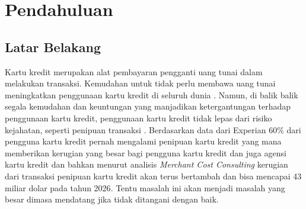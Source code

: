 \newpage
\chapter{Pendahuluan} \label{Bab I}

\section{Latar Belakang} \label{I.Latar Belakang}
Kartu kredit merupakan alat pembayaran pengganti uang tunai dalam melakukan transaksi. Kemudahan untuk tidak perlu membawa uang tunai meningkatkan penggunaan kartu kredit di seluruh dunia \cite{suryohadibroto1987surat}. Namun, di balik balik segala kemudahan dan keuntungan yang manjadikan ketergantungan terhadap penggunaan kartu kredit, penggunaan kartu kredit tidak lepas dari risiko kejahatan, seperti penipuan transaksi \cite{hendarsyah2020analisis}. Berdasarkan data dari Experian 60\% dari pengguna kartu kredit pernah mengalami penipuan kartu kredit yang mana memberikan kerugian yang besar bagi pengguna kartu kredit dan juga agensi kartu kredit \cite{experian_2024} dan bahkan menurut analisis \textit{Merchant Cost Consulting} kerugian dari transaksi penipuan kartu kredit akan terus bertambah dan bisa mencapai 43 miliar dolar pada tahun 2026\cite{merchantcostconsulting_2024}. Tentu masalah ini akan menjadi masalah yang besar dimasa mendatang jika tidak ditangani dengan baik.

